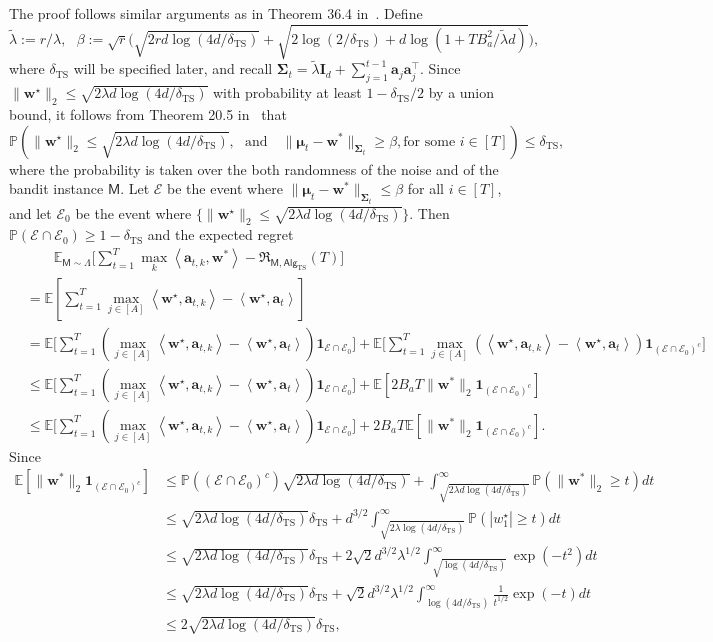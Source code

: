 \documentclass[10pt]{article}
\newcommand{\id}{\bI}
\newcommand{\<}{\left\langle}
\renewcommand{\>}{\right\rangle}
\newcommand{\bone}{{\mathbf 1}}
\newcommand{\E}{\mathbb{E}}
\renewcommand{\P}{\mathbb{P}}
\newcommand{\inst}{{\mathsf{M}}}
\newcommand{\TS}{{\mathrm{TS}}}
\newcommand{\Tpsmean}{{{\mathbf\mu}}}
\newcommand{\Tpscov}{{{\mathbf\Sigma}}}
\newcommand{\Tpsparn}{{r}}
\newcommand{\hpevent}{{\mathcal E}}
\newcommand{\totlen}{{T}}
\newcommand{\sAlg}{{\mathsf{Alg}}}
\newcommand{\prior}{{\Lambda}}
\newcommand{\totreward}{{\mathfrak{R}}}
\def\bI{{\mathbf I}}
\def\ba{{\mathbf a}}
\def\bw{{\mathbf w}}
\begin{document}
The proof follows similar arguments as in  Theorem 36.4 in~\cite{lattimore2020bandit}. Define $$\tilde\lambda:=\Tpsparn/\lambda,~~~\beta:=\sqrt{\Tpsparn}\Big(\sqrt{2\Tpsparn d\log(4d/{\delta_{\TS}})}+\sqrt{2\log(2/{\delta_{\TS}})+d\log(1+TB_a^2/\tilde\lambda d)}\Big),
$$
where ${\delta_{\TS}}$ will be specified later,  and recall $\Tpscov_t=\tilde\lambda \id_d+\sum_{j=1}^{t-1}\ba_j\ba_j^\top$. Since $\|\bw^\star\|_2\leq\sqrt{2\lambda d\log(4d/{\delta_{\TS}})}$ with probability at least $1-{\delta_{\TS}}/2$ by a union bound, it  follows from Theorem 20.5 in~\cite{lattimore2020bandit} that  $$\P(\|\bw^\star\|_2\leq\sqrt{2\lambda d\log(4d/{\delta_{\TS}})},~~~\text{and~~~}\|\Tpsmean_t-\bw^*\|_{\Tpscov_t}\geq\beta,\text{for some } i\in[T])\leq{\delta_{\TS}},$$ where the probability is taken over the both randomness of the noise and of the bandit instance $\inst$.
Let $\hpevent$ be the event where $\|\Tpsmean_t-\bw^*\|_{\Tpscov_t}\leq\beta$ for all $i\in[T]$, and let $\hpevent_0$ be the event where $\{\|\bw^\star\|_2\leq\sqrt{2\lambda d\log(4d/{\delta_{\TS}})}\}$. Then $\P(\hpevent\cap\hpevent_0)\geq 1-{\delta_{\TS}}$ and the expected regret
\begin{align*}
&\qquad\E_{\inst\sim\prior}\Big[\sum_{t=1}^\totlen\max_{k}\<\ba_{t,k},\bw^*\>-\totreward_{\inst,\sAlg_\TS}(\totlen)\Big]\\
&=\E[\sum_{t=1}^T \max_{j\in[A]}\<\bw^\star,\ba_{t,k}\>-\<\bw^\star,\ba_{t}\>]\\
  &=
  \E\Big[\sum_{t=1}^T (\max_{j\in[A]}\<\bw^\star,\ba_{t,k}\>-\<\bw^\star,\ba_{t}\>) \bone_{\hpevent\cap\hpevent_0}\Big]
  +
   \E\Big[\sum_{t=1}^T \max_{j\in[A]}(\<\bw^\star,\ba_{t,k}\>-\<\bw^\star,\ba_{t}\>)\bone_{(\hpevent\cap\hpevent_0)^c}\Big]\\
   &\leq
   \E\Big[\sum_{t=1}^T (\max_{j\in[A]}\<\bw^\star,\ba_{t,k}\>-\<\bw^\star,\ba_{t}\>) \bone_{\hpevent\cap\hpevent_0}\Big]
+
\E[2B_aT\|\bw^*\|_2\bone_{(\hpevent\cap\hpevent_0)^c}]
  \\
  &\leq
  \E\Big[\sum_{t=1}^T (\max_{j\in[A]}\<\bw^\star,\ba_{t,k}\>-\<\bw^\star,\ba_{t}\>) \bone_{\hpevent\cap\hpevent_0}\Big]+2B_aT\E[\|\bw^*\|_2\bone_{(\hpevent\cap\hpevent_0)^c}].
\end{align*}
Since
\begin{align*}
 \E[\|\bw^*\|_2\bone_{(\hpevent\cap\hpevent_0)^c}]
    &\leq
\P({(\hpevent\cap\hpevent_0)^c})\sqrt{2\lambda d\log(4d/{\delta_{\TS}})}
+
\int^\infty_{\sqrt{2\lambda d\log(4d/{\delta_{\TS}})}}\P(\|\bw^*\|_2\geq t)dt\\
&\leq
\sqrt{2\lambda d\log(4d/{\delta_{\TS}})}{\delta_{\TS}}+d^{3/2}\int^\infty_{\sqrt{2\lambda \log(4d/{\delta_{\TS}})}}\P(|w_1^\star|\geq t)dt
\\
&\leq
\sqrt{2\lambda d\log(4d/{\delta_{\TS}})}{\delta_{\TS}}+2\sqrt{2}d^{3/2}\lambda^{1/2}\int^\infty_{\sqrt{ \log(4d/{\delta_{\TS}})}}\exp(-{t^2})dt\\
&\leq
\sqrt{2\lambda d\log(4d/{\delta_{\TS}})}{\delta_{\TS}}+\sqrt{2}d^{3/2}\lambda^{1/2}\int^\infty_{{ \log(4d/{\delta_{\TS}})}}\frac{1}{t^{1/2}}\exp(-{t})dt\\
&\leq
2\sqrt{2\lambda d\log(4d/{\delta_{\TS}})}{\delta_{\TS}},
\end{align*}
\end{document}

